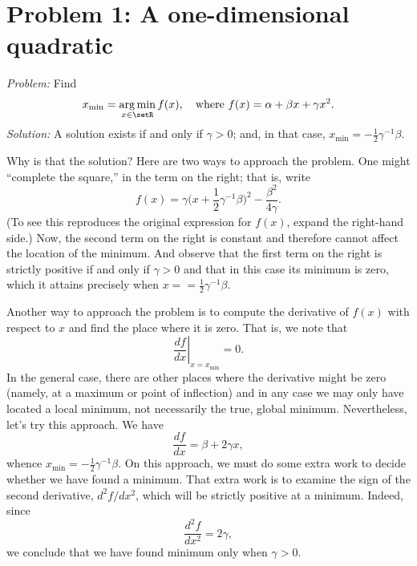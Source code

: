 \documentclass[10pt, a4paper]{article}
\DeclareMathOperator*{\argmin}{arg\,min}
\begin{document}
\section{Problem 1: A one-dimensional quadratic}

\emph{Problem:} Find
\begin{equation}
  x_\text{min} = \argmin_{x\in\setR} f(x), \quad\text{where $f(x) = \alpha + \beta x + \gamma x^2$}.
\label{problem-quadr-one-d}
\end{equation}
\emph{Solution:} A solution exists if and only if $\gamma>0$; and, in
that case, $x_\text{min} = -\frac{1}{2}\gamma^{-1}\beta$.

Why is that the solution? Here are two ways to approach the
problem. One might “complete the square,” in the term on the right;
that is, write
\begin{equation*}
  f(x) = \gamma\bigl(x + \frac{1}{2}\gamma^{-1}\beta\bigr)^2 - \frac{\beta^2}{4\gamma}. 
\end{equation*}
(To see this reproduces the original expression for $f(x)$, expand the
right-hand side.) Now, the second term on the right is constant and
therefore cannot affect the location of the minimum. And observe that
the first term on the right is strictly positive if and only if
$\gamma>0$ and that in this case its minimum is zero, which it attains
precisely when $x = =\frac{1}{2}\gamma^{-1}\beta$.

Another way to approach the problem is to compute the derivative of
$f(x)$ with respect to $x$ and find the place where it is zero. That
is, we note that
\begin{equation*}
  \left.\frac{df}{dx}\right|_{x = x_\text{min}} = 0.
\end{equation*}
In the general case, there are other places where the derivative might
be zero (namely, at a maximum or point of inflection) and in any case
we may only have located a local minimum, not necessarily the true,
global minimum. Nevertheless, let's try this approach. We have
\begin{equation*}
  \frac{df}{dx} = \beta + 2 \gamma x,
\end{equation*}
whence $x_\text{min} = -\frac{1}{2}\gamma^{-1}\beta$. On this approach, we must
do some extra work to decide whether we have found a minimum. That
extra work is to examine the sign of the second derivative, $d^2f/dx^2$,
which will be strictly positive at a minimum. Indeed, since
\begin{equation*}
  \frac{d^2f}{dx^2} = 2\gamma,
\end{equation*}
we conclude that we have found minimum only when $\gamma> 0$.
\end{document}
